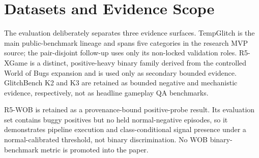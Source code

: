 \section{Datasets and Evidence Scope}
\label{sec:datasets}

The evaluation deliberately separates three evidence surfaces. TempGlitch is the main
public-benchmark lineage and spans five categories in the research MVP source; the pair-disjoint
follow-up uses only its non-locked validation roles. R5-XGame is a distinct, positive-heavy
binary family derived from the controlled World of Bugs expansion and is used only as secondary
bounded evidence. GlitchBench K2 and K3 are retained as bounded negative and mechanistic evidence,
respectively, not as headline gameplay QA benchmarks.

R5-WOB is retained as a provenance-bound positive-probe result. Its evaluation set contains buggy
positives but no held normal-negative episodes, so it demonstrates pipeline execution and
class-conditional signal presence under a normal-calibrated threshold, not binary discrimination.
No WOB binary-benchmark metric is promoted into the paper.
